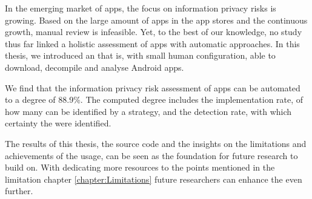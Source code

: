 In the emerging market of \mH apps, the focus on information privacy risks is growing.
Based on the large amount of apps in the app stores and the continuous growth, manual review is infeasible.
Yet, to the best of our knowledge, no study thus far linked a holistic \ipr assessment of \mH apps with automatic \sca approaches.
In this thesis, we introduced an \aiprat that is, with small human configuration, able to download, decompile and analyse Android \mH apps.

We find that the information privacy risk assessment of \mH apps can be automated to a degree of 88.9\%.
The computed degree includes the implementation rate, of how many \ipr can be identified by a \sca strategy, and the detection rate, with which certainty the \ipr were identified.

The results of this thesis, the \aiprat source code and the insights on the limitations and achievements of the \sca usage, can be seen as the foundation for future research to build on.
With dedicating more resources to the points mentioned in the limitation chapter \ref{chapter:Limitations} future researchers can enhance the \aiprat even further.
